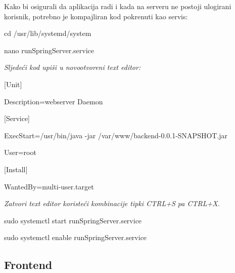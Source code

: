                 {Kako bi osigurali da aplikacija radi i kada na serveru ne postoji ulogirani korisnik, potrebno je kompajliran kod pokrenuti kao servis:}

                \begin{packed_item}
        			\item {cd /usr/lib/systemd/system}
        			\item {nano runSpringServer.service}
        			\item \textit{Sljedeći kod upiši u novootvoreni text editor:}
        			\item {[Unit]}
                    \item {Description=webserver Daemon}
                    \item {[Service]}
                    \item {ExecStart=/usr/bin/java -jar /var/www/backend-0.0.1-SNAPSHOT.jar}
                    \item {User=root}
                    \item {[Install]}
                    \item {WantedBy=multi-user.target}
        			\item \textit{Zatvori text editor koristeći kombinacije tipki CTRL+S pa CTRL+X.}
        			\item {sudo systemctl start runSpringServer.service}
        			\item {sudo systemctl enable runSpringServer.service}
        		\end{packed_item}

            \subsection{Frontend}

                {}
			
			\eject 